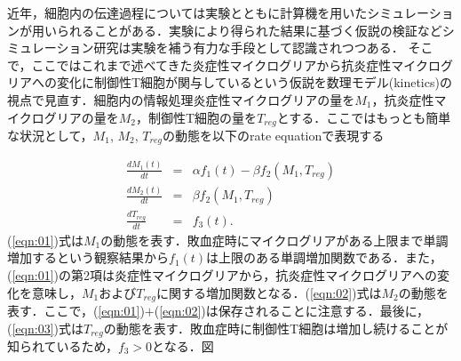 \documentclass{jsarticle}
\begin{document}
近年，細胞内の伝達過程については実験とともに計算機を用いたシミュレーションが用いられることがある．実験により得られた結果に基づく仮説の検証などシミュレーション研究は実験を補う有力な手段として認識されつつある．
そこで，ここではこれまで述べてきた炎症性マイクログリアから抗炎症性マイクログリアへの変化に制御性T細胞が関与しているという仮説を数理モデル(kinetics)の視点で見直す．細胞内の情報処理炎症性マイクログリアの量を$M_1$，抗炎症性マイクログリアの量を$M_2$，制御性T細胞の量を$T_{reg}$とする．ここではもっとも簡単な状況として，$M_1$, $M_2$, $T_{reg}$の動態を以下のrate equationで表現する

\begin{eqnarray}
  \label{eqn:01}
  \frac{dM_{1}(t)}{dt} &=& \alpha f_1(t)- \beta f_2(M_1, T_{reg}) \\
  \label{eqn:02}
  \frac{dM_2(t)}{dt} &=& \beta f_2(M_1, T_{reg}) \\
  \label{eqn:03}
  \frac{dT_{reg}}{dt} &=& f_3(t).
\end{eqnarray}
(\ref{eqn:01})式は$M_1$の動態を表す．敗血症時にマイクログリアがある上限まで単調増加するという観察結果から$f_1(t)$は上限のある単調増加関数である．また，(\ref{eqn:01})の第2項は炎症性マイクログリアから，抗炎症性マイクログリアへの変化を意味し，$M_1$および$T_{reg}$に関する増加関数となる．(\ref{eqn:02})式は$M_2$の動態を表す．ここで，(\ref{eqn:01})$+$(\ref{eqn:02})は保存されることに注意する．最後に，(\ref{eqn:03})式は$T_{reg}$の動態を表す．敗血症時に制御性T細胞は増加し続けることが知られているため，$f_3>0$となる．図
\end{document}
